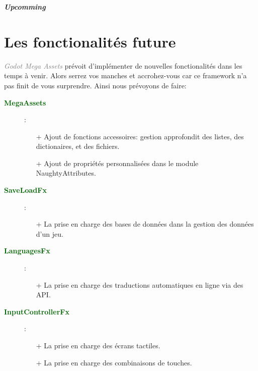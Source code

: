 \documentclass[a4paper, 11pt]{article}
\begin{document}
	\pagecolor{silver}
	\huge{\hspace{14.5cm}\textit{\textbf{Upcomming}}}\large{}
	\section{Les fonctionalités future}
	\textcolor{gray}{\textit{Godot Mega Assets}} prévoit d'implémenter de nouvelles fonctionalités dans les
	temps à venir. Alors serrez vos manches et accrohez-vous car ce framework n'a pas finit de vous 
	surprendre. Ainsi nous prévoyons de faire:
	\begin{description}
		\item [\textcolor{darkgreen}{\textbf{MegaAssets}}]:
		\begin{itemize}
			\item[+] Ajout de fonctions accessoires: gestion approfondit des listes, des dictionaires, et 
			des fichiers.
			\item[+] Ajout de propriétés personnalisées dans le module NaughtyAttributes.\\
		\end{itemize}
	\end{description}
	\begin{description}
		\item [\textcolor{darkgreen}{\textbf{SaveLoadFx}}]:
		\begin{itemize}
			\item[+] La prise en charge des bases de données dans la gestion des données d'un jeu.\\
		\end{itemize}
	\end{description}
	\begin{description}
		\item [\textcolor{darkgreen}{\textbf{LanguagesFx}}]:
		\begin{itemize}
			\item[+] La prise en charge des traductions automatiques en ligne via des API.\\
		\end{itemize}
	\end{description}
	\begin{description}
		\item [\textcolor{darkgreen}{\textbf{InputControllerFx}}]:
		\begin{itemize}
			\item[+] La prise en charge des écrans tactiles.
			\item[+] La prise en charge des combinaisons de touches.\\
		\end{itemize}
	\end{description}
\end{document}

